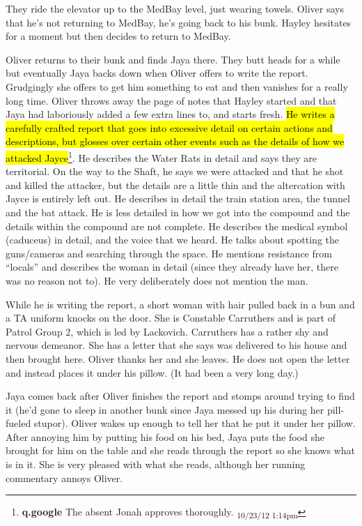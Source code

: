 They ride the elevator up to the MedBay level, just wearing towels.  Oliver says that he's not returning to MedBay, he's going back to his bunk.  Hayley hesitates for a moment but then decides to return to MedBay.  



Oliver returns to their bunk and finds Jaya there.  They butt heads for a while but eventually Jaya backs down when Oliver offers to write the report.  Grudgingly she offers to get him something to eat and then vanishes for a really long time.  Oliver throws away the page of notes that Hayley started and that Jaya had laboriously added a few extra lines to, and starts fresh.  \hl{He writes a carefully crafted report that goes into excessive detail on certain actions and descriptions, but glosses over certain other events such as the details of how we attacked Jayce}\footnote{\textbf{q.google }The absent Jonah approves thoroughly. \textsubscript{10/23/12 1:14pm}}.  He describes the Water Rats in detail and says they are territorial.  On the way to the Shaft, he says we were attacked and that he shot and killed the attacker, but the details are a little thin and the altercation with Jayce is entirely left out.  He describes in detail the train station area, the tunnel and the bat attack.  He is less detailed in how we got into the compound and the details within the compound are not complete.  He describes the medical symbol (caduceus) in detail, and the voice that we heard.  He talks about spotting the guns/cameras and searching through the space.  He mentions resistance from ``locals'' and describes the woman in detail (since they already have her, there was no reason not to).  He very deliberately does not mention the man.



While he is writing the report, a short woman with hair pulled back in a bun and a TA uniform knocks on the door.  She is Constable Carruthers and is part of Patrol Group 2, which is led by Lackovich.  Carruthers has a rather shy and nervous demeanor.  She has a letter that she says was delivered to his house and then brought here.  Oliver thanks her and she leaves.  He does not open the letter and instead places it under his pillow. (It had been a very long day.)



Jaya comes back after Oliver finishes the report and stomps around trying to find it (he'd gone to sleep in another bunk since Jaya messed up his during her pill-fueled stupor).  Oliver wakes up enough to tell her that he put it under her pillow.  After annoying him by putting his food on his bed, Jaya puts the food she brought for him on the table and she reads through the report so she knows what is in it.  She is very pleased with what she reads, although her running commentary annoys Oliver.



